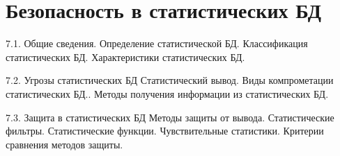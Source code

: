 \section{Безопасность в статистических БД}

7.1. Общие сведения. 
Определение статистической БД. Классификация статистических БД. Характеристики статистических БД.

7.2. Угрозы статистических БД
Статистический вывод. Виды компрометации статистических БД.. Методы получения информации из статистических БД.

7.3. Защита в статистических БД
Методы защиты от вывода. Статистические фильтры. Статистические функции. Чувствительные статистики. Критерии сравнения методов защиты.
